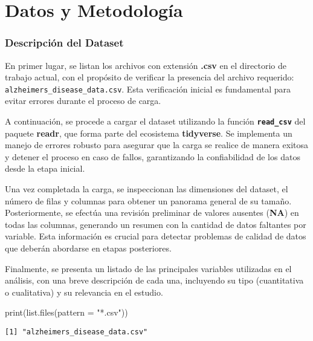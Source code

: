 \documentclass[
  letterpaper,
  DIV=11,
  numbers=noendperiod]{scrartcl}
\newenvironment{Shaded}{\begin{snugshade}}{\end{snugshade}}
\newcommand{\AttributeTok}[1]{\textcolor[rgb]{0.40,0.45,0.13}{#1}}
\newcommand{\FunctionTok}[1]{\textcolor[rgb]{0.28,0.35,0.67}{#1}}
\newcommand{\NormalTok}[1]{\textcolor[rgb]{0.00,0.23,0.31}{#1}}
\newcommand{\StringTok}[1]{\textcolor[rgb]{0.13,0.47,0.30}{#1}}
\begin{document}
\pagebreak

\section{Datos y Metodología}\label{datos-y-metodologuxeda}

\subsubsection{Descripción del
Dataset}\label{descripciuxf3n-del-dataset}

En primer lugar, se listan los archivos con extensión \textbf{.csv} en
el directorio de trabajo actual, con el propósito de verificar la
presencia del archivo requerido: \texttt{alzheimers\_disease\_data.csv}.
Esta verificación inicial es fundamental para evitar errores durante el
proceso de carga.

A continuación, se procede a cargar el dataset utilizando la función
\textbf{\texttt{read\_csv}} del paquete \textbf{readr}, que forma parte
del ecosistema \textbf{tidyverse}. Se implementa un manejo de errores
robusto para asegurar que la carga se realice de manera exitosa y
detener el proceso en caso de fallos, garantizando la confiabilidad de
los datos desde la etapa inicial.

Una vez completada la carga, se inspeccionan las dimensiones del
dataset, el número de filas y columnas para obtener un panorama general
de su tamaño. Posteriormente, se efectúa una revisión preliminar de
valores ausentes (\textbf{NA}) en todas las columnas, generando un
resumen con la cantidad de datos faltantes por variable. Esta
información es crucial para detectar problemas de calidad de datos que
deberán abordarse en etapas posteriores.

Finalmente, se presenta un listado de las principales variables
utilizadas en el análisis, con una breve descripción de cada una,
incluyendo su tipo (cuantitativa o cualitativa) y su relevancia en el
estudio.

\begin{Shaded}
\begin{Highlighting}[]
\FunctionTok{print}\NormalTok{(}\FunctionTok{list.files}\NormalTok{(}\AttributeTok{pattern =} \StringTok{"*.csv"}\NormalTok{))}
\end{Highlighting}
\end{Shaded}

\begin{verbatim}
[1] "alzheimers_disease_data.csv"
\end{verbatim}
\end{document}
